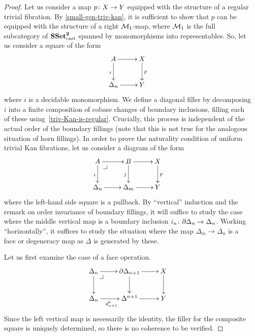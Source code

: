 \documentclass[reqno,10pt,a4paper,oneside,draft]{amsart}
\begin{document}
\begin{proof}
Let us consider a map $p \co X \to Y$ equipped with the structure of a regular trivial fibration.
By \cref{small-gen-triv-kan}, it is sufficient to show that $p$ can be equipped with the structure of a right $\cal{M}_1$-map, where $\cal{M}_1$ is the full subcategory of $\SSet^{\mathbf{2}}_\cart$ spanned by monomorphisms into representables.
So, let us consider a square of the form
\[
\xymatrix{
  A \ar[d]_i \ar[r] & X \ar[d]^p \\
  \Delta_n \ar[r] & Y
}
\]
where $i$ is a decidable monomorphism.
We define a diagonal filler by decomposing $i$ into a finite composition of cobase changes of boundary inclusions, filling each of these using~\cref{triv-Kan-is-regular}.
Crucially, this process is independent of the actual order of the boundary fillings (note that this is not true for the analogous situation of horn fillings).
In order to prove the naturality condition of uniform trivial Kan fibrations, let us consider a diagram of the form
\[
\xymatrix{
  A
  \ar[r]
  \ar[d]_i
  \pullback{dr}
&
  B
  \ar[d]_j
  \ar[r]
&
  X
  \ar[d]^p
\\
  \Delta_{n}
  \ar[r]
&
  \Delta_{m}
  \ar[r]
&
  Y
}
\]
where the left-hand side square is a pullback.
By ``vertical'' induction and the remark on order invariance of boundary fillings, it will suffice to study the case where the middle vertical map is a boundary inclusion $i_n \co \partial \Delta_n \to \Delta_n$.
Working ``horizontally'', it suffices to study the situation where the map $\Delta_{m} \to \Delta_n$ is a face or degeneracy map as $\Delta$ is generated by these.

Let us first examine the case of a face operation.
\[
\xymatrix{
  \Delta_n
  \ar[r]
  \ar[d]
  \pullback{dr}
&
  \partial \Delta_{n+1}
  \ar[d]
  \ar[r]
&
  X
  \ar[d]
\\
  \Delta_n
  \ar[r]_{d^k_{n+1}}
&
  \Delta^{n+1}
  \ar[r]
&
  Y
}
\]
Since the left vertical map is necessarily the identity, the filler for the composite square is uniquely determined, so there is no coherence to be verified.


\end{proof}
\end{document}
